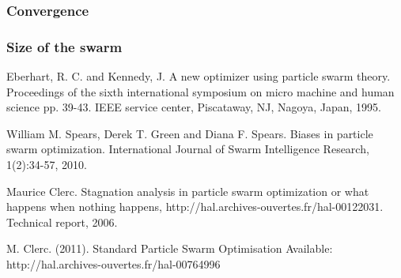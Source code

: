 \documentclass[runningheads,a4paper]{llncs}
\begin{document}
\subsubsection{Convergence}


\subsubsection{Size of the swarm}



\begin{thebibliography}{9}

Eberhart, R. C. and Kennedy, J. A new optimizer using particle swarm theory. Proceedings of the sixth international symposium on micro machine and human science pp. 39-43. IEEE service center, Piscataway, NJ, Nagoya, Japan, 1995.

William M. Spears, Derek T. Green and Diana F. Spears. Biases in particle swarm optimization. International Journal of Swarm Intelligence Research, 1(2):34-57, 2010.

Maurice Clerc. Stagnation analysis in particle swarm optimization or what happens when nothing happens, http://hal.archives-ouvertes.fr/hal-00122031. Technical report, 2006.

M. Clerc. (2011). Standard Particle Swarm Optimisation Available: http://hal.archives-ouvertes.fr/hal-00764996 

\end{thebibliography}
\end{document}
